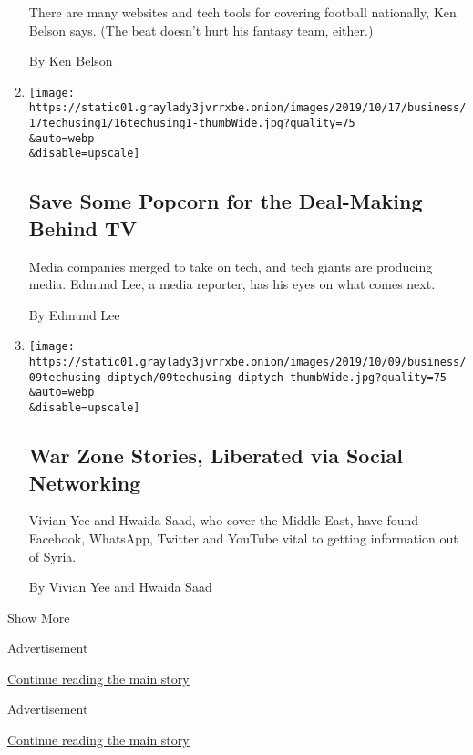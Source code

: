 \begin{enumerate}
  There are many websites and tech tools for covering football
  nationally, Ken Belson says. (The beat doesn't hurt his fantasy team,
  either.)

  By Ken Belson
\item
  \href{/2019/10/16/technology/personaltech/save-some-popcorn-for-the-deal-making-behind-tv.html}{}

  \texttt{[image: https://static01.graylady3jvrrxbe.onion/images/2019/10/17/business/17techusing1/16techusing1-thumbWide.jpg?quality=75\\\&auto=webp\\\&disable=upscale]}

  \hypertarget{save-some-popcorn-for-the-deal-making-behind-tv}{%
  \subsection{Save Some Popcorn for the Deal-Making Behind
  TV}\label{save-some-popcorn-for-the-deal-making-behind-tv}}

  Media companies merged to take on tech, and tech giants are producing
  media. Edmund Lee, a media reporter, has his eyes on what comes next.

  By Edmund Lee
\item
  \href{/2019/10/09/technology/personaltech/social-media-war.html}{}

  \texttt{[image: https://static01.graylady3jvrrxbe.onion/images/2019/10/09/business/09techusing-diptych/09techusing-diptych-thumbWide.jpg?quality=75\\\&auto=webp\\\&disable=upscale]}

  \hypertarget{war-zone-stories-liberated-via-social-networking}{%
  \subsection{War Zone Stories, Liberated via Social
  Networking}\label{war-zone-stories-liberated-via-social-networking}}

  Vivian Yee and Hwaida Saad, who cover the Middle East, have found
  Facebook, WhatsApp, Twitter and YouTube vital to getting information
  out of Syria.

  By Vivian Yee and Hwaida Saad
\end{enumerate}

Show More

Advertisement

\protect\hyperlink{after-mid1}{Continue reading the main story}

Advertisement

\protect\hyperlink{after-mktg}{Continue reading the main story}

